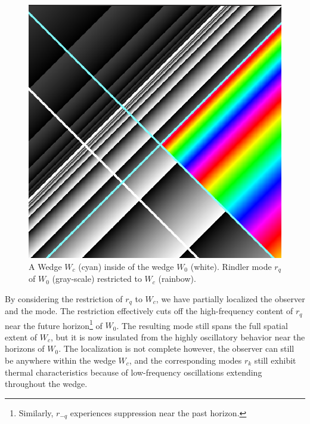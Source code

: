 \documentclass[12pt,a4paper]{article}
\begin{document}
{\begin{figure}[h]
  \centering
\includegraphics[scale=0.4]{wedge_in_wedge.png}
\caption{A Wedge $W_c$ (cyan) inside of the wedge $W_0$ (white). Rindler mode $r_q$ of $W_0$ (gray-scale) restricted to $W_c$ (rainbow).}
\label{restrict}
\end{figure}

By considering the restriction of $r_q$ to $W_c$, we have partially localized the observer and the mode. The restriction effectively cuts off the high-frequency content of $r_q$ near the future horizon\footnote{Similarly, $r_{-q}$ experiences suppression near the past horizon.} of $W_0$. The resulting mode still spans the full spatial extent of $W_c$, but it is now insulated from the highly oscillatory behavior near the horizons of $W_0$.  The localization is not complete however, the observer can still be anywhere within the wedge $W_c$, and the corresponding modes $r_k$ still exhibit thermal characteristics because of low-frequency oscillations extending throughout the wedge.

}
\end{document}
